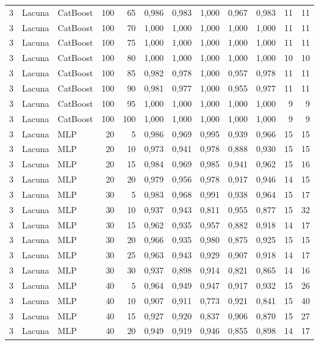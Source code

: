 \begin{longtable}{@{}rllrrrrrrrrr@{}}
3 & Lacuna & CatBoost & 100 & 65 & 0,986 & 0,983 & 1,000 & 0,967 & 0,983 & 11 & 11 \\
3 & Lacuna & CatBoost & 100 & 70 & 1,000 & 1,000 & 1,000 & 1,000 & 1,000 & 11 & 11 \\
3 & Lacuna & CatBoost & 100 & 75 & 1,000 & 1,000 & 1,000 & 1,000 & 1,000 & 11 & 11 \\
3 & Lacuna & CatBoost & 100 & 80 & 1,000 & 1,000 & 1,000 & 1,000 & 1,000 & 10 & 10 \\
3 & Lacuna & CatBoost & 100 & 85 & 0,982 & 0,978 & 1,000 & 0,957 & 0,978 & 11 & 11 \\
3 & Lacuna & CatBoost & 100 & 90 & 0,981 & 0,977 & 1,000 & 0,955 & 0,977 & 11 & 11 \\
3 & Lacuna & CatBoost & 100 & 95 & 1,000 & 1,000 & 1,000 & 1,000 & 1,000 & 9 & 9 \\
3 & Lacuna & CatBoost & 100 & 100 & 1,000 & 1,000 & 1,000 & 1,000 & 1,000 & 9 & 9 \\
3 & Lacuna & MLP & 20 & 5 & 0,986 & 0,969 & 0,995 & 0,939 & 0,966 & 15 & 15 \\
3 & Lacuna & MLP & 20 & 10 & 0,973 & 0,941 & 0,978 & 0,888 & 0,930 & 15 & 15 \\
3 & Lacuna & MLP & 20 & 15 & 0,984 & 0,969 & 0,985 & 0,941 & 0,962 & 15 & 16 \\
3 & Lacuna & MLP & 20 & 20 & 0,979 & 0,956 & 0,978 & 0,917 & 0,946 & 14 & 15 \\
3 & Lacuna & MLP & 30 & 5 & 0,983 & 0,968 & 0,991 & 0,938 & 0,964 & 15 & 17 \\
3 & Lacuna & MLP & 30 & 10 & 0,937 & 0,943 & 0,811 & 0,955 & 0,877 & 15 & 32 \\
3 & Lacuna & MLP & 30 & 15 & 0,962 & 0,935 & 0,957 & 0,882 & 0,918 & 14 & 17 \\
3 & Lacuna & MLP & 30 & 20 & 0,966 & 0,935 & 0,980 & 0,875 & 0,925 & 15 & 15 \\
3 & Lacuna & MLP & 30 & 25 & 0,963 & 0,943 & 0,929 & 0,907 & 0,918 & 14 & 17 \\
3 & Lacuna & MLP & 30 & 30 & 0,937 & 0,898 & 0,914 & 0,821 & 0,865 & 14 & 16 \\
3 & Lacuna & MLP & 40 & 5 & 0,964 & 0,949 & 0,947 & 0,917 & 0,932 & 15 & 26 \\
3 & Lacuna & MLP & 40 & 10 & 0,907 & 0,911 & 0,773 & 0,921 & 0,841 & 15 & 40 \\
3 & Lacuna & MLP & 40 & 15 & 0,927 & 0,920 & 0,837 & 0,906 & 0,870 & 15 & 27 \\
3 & Lacuna & MLP & 40 & 20 & 0,949 & 0,919 & 0,946 & 0,855 & 0,898 & 14 & 17 \\

\end{longtable}
